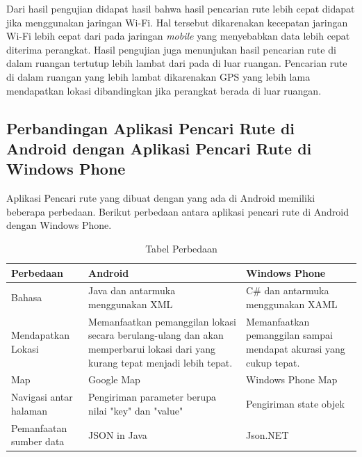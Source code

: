 \hspace{0.5cm} Dari hasil pengujian didapat hasil bahwa hasil pencarian rute lebih cepat didapat jika menggunakan jaringan Wi-Fi. Hal tersebut dikarenakan kecepatan jaringan Wi-Fi lebih cepat dari pada jaringan \textit{mobile} yang menyebabkan data lebih cepat diterima perangkat. Hasil pengujian juga menunjukan hasil pencarian rute di dalam ruangan tertutup lebih lambat dari pada di luar ruangan. Pencarian rute di dalam ruangan yang lebih lambat dikarenakan GPS yang lebih lama mendapatkan lokasi dibandingkan jika perangkat berada di luar ruangan. 	
	
\subsection{Perbandingan Aplikasi Pencari Rute di Android dengan Aplikasi Pencari Rute di Windows Phone}
\label{lab:Perbandingan}
\hspace{0.5cm} Aplikasi Pencari rute yang dibuat dengan yang ada di Android memiliki beberapa perbedaan. Berikut perbedaan antara aplikasi pencari rute di Android dengan Windows Phone.

\begin{table}[h]
	\centering
		\begin{tabular}{|p{4cm}|p{4cm}|p{4cm}|}\hline
				Perbedaan & Android & Windows Phone \\ \hline
				Bahasa & Java dan antarmuka menggunakan XML & C\# dan antarmuka menggunakan XAML \\ \hline
				Mendapatkan Lokasi & Memanfaatkan pemanggilan lokasi secara berulang-ulang dan akan memperbarui lokasi dari yang kurang tepat menjadi lebih tepat. & Memanfaatkan pemanggilan sampai mendapat akurasi yang cukup tepat. \\ \hline
				Map  & Google Map & Windows Phone Map \\ \hline
				Navigasi antar halaman  & Pengiriman parameter berupa nilai "key" dan "value" & Pengiriman state objek \\ \hline
				Pemanfaatan sumber data & JSON in Java & Json.NET \\ \hline
		\end{tabular}
	\caption{Tabel Perbedaan}
	\label{tab:TabelPerbedaan}
\end{table}    
